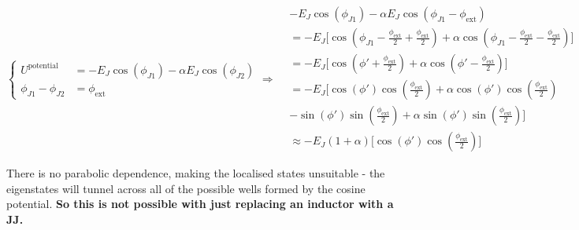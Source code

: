  \begin{equation}
   \left\lbrace\begin{aligned}
       U^{\text{potential}} & = -E_J\cos(\phi_{J1}) - \alpha E_J\cos(\phi_{J2})\\
       \phi_{J1} - \phi_{J2} & = \phi_\text{ext}
     \end{aligned}\right. \Rightarrow
   \begin{aligned}
     &-E_J\cos(\phi_{J1}) - \alpha E_J\cos(\phi_{J1}-\phi_\text{ext})\\
     & = -E_J\bigg[\cos(\phi_{J1}-\frac{\phi_\text{ext}}{2}+\frac{\phi_\text{ext}}{2}) + \alpha\cos(\phi_{J1}-\frac{\phi_\text{ext}}{2}-\frac{\phi_\text{ext}}{2})\bigg]\\
     & = -E_J\bigg[\cos(\phi'+\frac{\phi_\text{ext}}{2}) + \alpha\cos(\phi'-\frac{\phi_\text{ext}}{2})\bigg]\\
     & = -E_J\bigg[\cos(\phi')\cos(\frac{\phi_\text{ext}}{2}) + \alpha\cos(\phi')\cos(\frac{\phi_\text{ext}}{2})\\
     & - \sin(\phi')\sin(\frac{\phi_\text{ext}}{2}) + \alpha\sin(\phi')\sin(\frac{\phi_\text{ext}}{2}) \bigg]\\
     &                                                           \approx
     -E_J(1+\alpha)\bigg[\cos(\phi')\cos(\frac{\phi_\text{ext}}{2})\bigg]
   \end{aligned}
 \end{equation}

 \noindent There is no parabolic dependence, making the localised states
 unsuitable -  the eigenstates  will tunnel across  all of  the possible
 wells formed by  the cosine potential. \textbf{So this  is not possible
   with just replacing an inductor with a JJ.}

 \newpage
